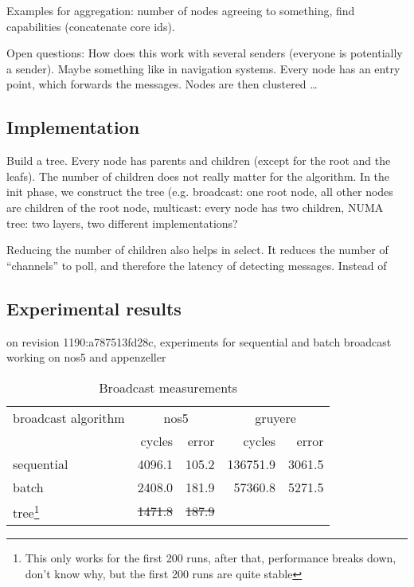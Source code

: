 \documentclass{article}
\begin{document}
Examples for aggregation: number of nodes agreeing to something, find
capabilities (concatenate core ids). 

Open questions: How does this work with several senders (everyone is
potentially a sender). Maybe something like in navigation
systems. Every node has an entry point, which forwards the
messages. Nodes are then clustered \ldots

\subsection{Implementation}

Build a tree. Every node has parents and children (except for the root
and the leafs). The number of children does not really matter for the
algorithm. In the init phase, we construct the tree (e.g. broadcast:
one root node, all other nodes are children of the root node,
multicast: every node has two children, NUMA tree: two layers, two
different implementations?

Reducing the number of children also helps in select. It reduces the
number of ``channels'' to poll, and therefore the latency of detecting
messages. Instead of 

\subsection{Experimental results}

on revision 1190:a787513fd28c, experiments for sequential and batch
broadcast working on nos5 and appenzeller

\begin{table}[htb]
  \centering
  \begin{tabular}{lrrrr}
    \toprule
    broadcast algorithm & \multicolumn{2}{c}{nos5} & \multicolumn{2}{c}{gruyere} \\
      & cycles & error & cycles & error \\
    \midrule
    sequential &  4096.1 &  105.2 & 136751.9 &   3061.5 \\
    batch      &  2408.0 &  181.9 &  57360.8 &   5271.5 \\
    tree\footnote{This only works for the first 200 runs, after that,
      performance breaks down, don't know why, but the first 200 runs
      are quite stable}%
               &  \sout{1471.8} &  \sout{187.9} &          &          \\
    \bottomrule
  \end{tabular}
  \caption{Broadcast measurements}
  \label{tab:bc_measurements}
\end{table}
\end{document}
